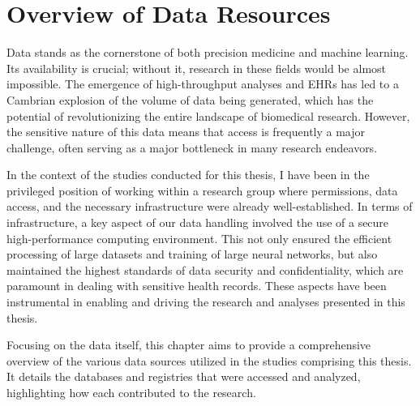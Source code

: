 \chapter{Overview of Data Resources}

Data stands as the cornerstone of both precision medicine and machine learning.
Its availability is crucial; without it, research in these
fields would be almost impossible. 
The emergence of high-throughput analyses and \acp{EHR} has 
led to a Cambrian explosion of the volume of data being generated,
which has the potential of revolutionizing the 
entire landscape of biomedical research. 
However, the sensitive nature of this data means
that access is frequently a major challenge, 
often serving as a major bottleneck in
many research endeavors.

In the context of the studies conducted for this thesis, I have been in the
privileged position of working within a research group where permissions, 
data access, and the necessary infrastructure were already well-established.
In terms of infrastructure, a key aspect of our data handling involved the use 
of a secure high-performance computing environment. 
This not only ensured the efficient processing of large datasets and 
training of large neural networks, 
but also maintained the highest standards of data security and
confidentiality, which are paramount in dealing with sensitive health records.
These aspects have been instrumental in enabling and driving 
the research and analyses presented in this thesis.

Focusing on the data itself,
this chapter aims to provide a comprehensive overview of the various data
sources utilized in the studies comprising this thesis. It details the
databases and registries that were accessed and analyzed,
highlighting how each contributed to the research. 

